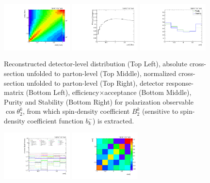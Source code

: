 \begin{refsection}
\begin{figure}[htb]
\begin{center}
 \includegraphics[width=0.32\textwidth]{fig_fullRun2UL/unfolding/combined/ResponseMatrix_b2k.pdf}
 \includegraphics[width=0.32\textwidth]{fig_fullRun2UL/unfolding/combined/TotEff_b2k.pdf}
 \includegraphics[width=0.32\textwidth]{fig_fullRun2UL/unfolding/combined/PurStab_b2k.pdf} \\
\caption{Reconstructed detector-level distribution (Top Left), absolute cross-section unfolded to parton-level (Top Middle), normalized cross-section unfolded to parton-level (Top Right), detector response-matrix (Bottom Left), efficiency$\times$acceptance (Bottom Middle), Purity and Stability (Bottom Right) for polarization observable $\cos\theta_{2}^{k}$, from which spin-density coefficient $B_{2}^{k}$ (sensitive to spin-density coefficient function $b_k^{-}$) is extracted.}
\label{fig:b2k}
\end{center}
\end{figure}
\clearpage
\begin{figure}[htb]
\begin{center}
 \includegraphics[width=0.32\textwidth]{fig_fullRun2UL/unfolding/combined/deltaSystCombinedlog_rebinnedB_b2k.pdf}
 \includegraphics[width=0.32\textwidth]{fig_fullRun2UL/unfolding/combined/StatCovMatrix_rebinnedB_b2k.pdf}

\end{center}
\end{figure}
\end{refsection}
